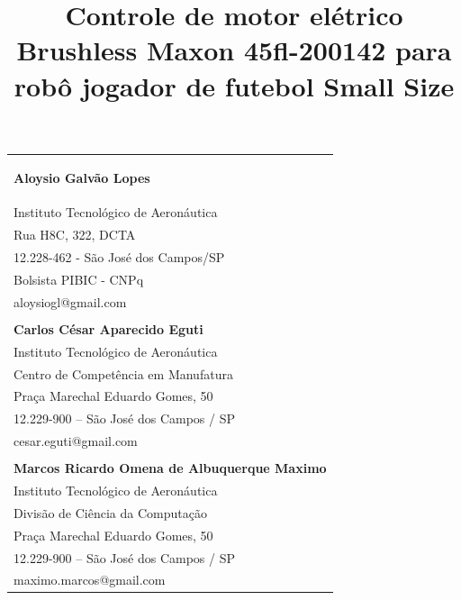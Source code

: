 \documentclass[10pt,fleqn,a4paper]{article}
\begin{document}
    
	{
	}
    \thispagestyle{firststyle}
    \vspace{-.5cm}
    \hspace{-.8cm}
    \begin{tabular}{p{\textwidth}}
    \begin{center}
    \vspace{-.6cm}
    \title{Controle de motor elétrico Brushless Maxon 45fl-200142 para robô jogador de futebol Small Size}
    \end{center}
    \textbf{Aloysio Galvão Lopes}\\
    \small{Instituto Tecnológico de Aeronáutica}\\
    \small{Rua H8C, 322, DCTA}\\
    \small{12.228-462 - São José dos Campos/SP}\\
    \small{Bolsista PIBIC - CNPq}\\
    \small{aloysiogl@gmail.com}\\
    \\ 
    \textbf{Carlos César Aparecido Eguti}\\
    \small{Instituto Tecnológico de Aeronáutica}\\
    \small{Centro de Competência em Manufatura}\\
    \small{Praça Marechal Eduardo Gomes, 50}\\
    \small{12.229-900 – São José dos Campos / SP}\\
    \small{cesar.eguti@gmail.com}\\
    \\ 
    \textbf{Marcos Ricardo Omena de Albuquerque Maximo}\\
    \small{Instituto Tecnológico de Aeronáutica}\\
    \small{Divisão de Ciência da Computação}\\
    \small{Praça Marechal Eduardo Gomes, 50}\\
    \small{12.229-900 – São José dos Campos / SP}\\
    \small{maximo.marcos@gmail.com}\\

\end{tabular}
\end{document}
